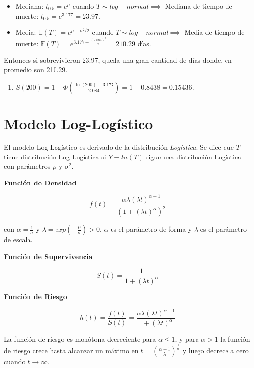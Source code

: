 \documentclass[
  a4paper,
  oneside,
  openany]{book}
\providecommand{\tightlist}{%
  \setlength{\itemsep}{0pt}\setlength{\parskip}{0pt}}
\begin{document}
\begin{itemize}
\tightlist
\item
  Mediana: \(t_{0.5} =e^{\mu}\) cuando \(T\sim log-normal \implies\) Mediana de tiempo de muerte: \(t_{0.5} = e^{3.177} = 23.97\).
\item
  Media: \(\mathbb{E}(T) = e^{\mu+\sigma^2/2}\) cuando \(T\sim log- normal \implies\) Media de tiempo de muerte: \(\mathbb{E}(T) = e^{3.177+\frac{(2.084)^2}{2}} = 210.29\) días.
\end{itemize}

Entonces si sobrevivieron 23.97, queda una gran cantidad de días donde, en promedio son 210.29.

\begin{enumerate}
\def\labelenumi{\arabic{enumi}.}
\setcounter{enumi}{1}
\tightlist
\item
  \(S(200) = 1-\Phi\left(\frac{\ln(200)-3.177}{2.084}\right) = 1-0.8438 = 0.15436\).
\end{enumerate}

\hypertarget{modelo-log-loguxedstico}{%
\section{Modelo Log-Logístico}\label{modelo-log-loguxedstico}}

El modelo Log-Logístico es derivado de la distribución \emph{Logística}. Se dice que \(T\) tiene distribución Log-Logística si \(Y=ln(T)\) sigue una distribución Logística con parámetros \(\mu\) y \(\sigma ^2\).

\textbf{Función de Densidad}

\[
f(t)=\frac{\alpha \lambda (\lambda t)^{\alpha-1}}{(1+(\lambda t)^\alpha)^2}
\]

con \(\alpha=\frac{1}{\sigma}\) y \(\lambda=exp(-\frac{\mu}{\sigma})>0\). \(\alpha\) es el parámetro de forma y \(\lambda\) es el parámetro de escala.

\textbf{Función de Supervivencia}

\[
S(t)=\frac{1}{1+(\lambda t)^\alpha}
\]

\textbf{Función de Riesgo}

\[
h(t)=\frac{f(t)}{S(t)}=\frac{\alpha \lambda (\lambda t)^{\alpha-1}}{1+(\lambda t)^\alpha}
\]

La función de riesgo es monótona decreciente para \(\alpha \leq 1\), y para \(\alpha> 1\) la función de riesgo crece hasta alcanzar un máximo en \(t=(\frac{\alpha-1}{\lambda})^{\frac{1}{\alpha}}\) y luego decrece a cero cuando \(t \rightarrow \infty\).
\end{document}
